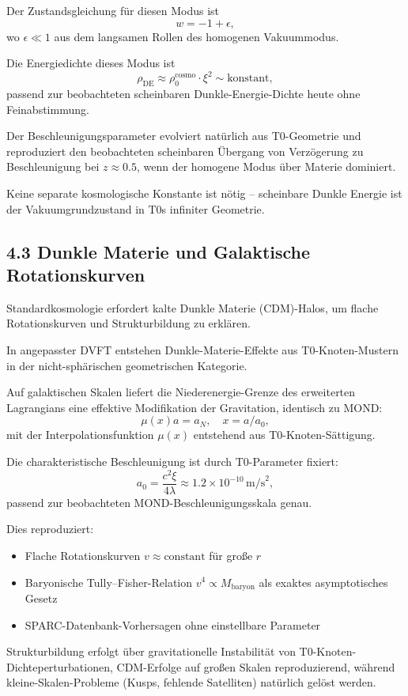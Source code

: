 	Der Zustandsgleichung für diesen Modus ist
	\[
	w = -1 + \epsilon,
	\]
	wo $\epsilon \ll 1$ aus dem langsamen Rollen des homogenen Vakuummodus.
	
	Die Energiedichte dieses Modus ist
	\[
	\rho_{\text{DE}} \approx \rho_0^{\text{cosmo}} \cdot \xi^2 \sim \text{konstant},
	\]
	passend zur beobachteten scheinbaren Dunkle-Energie-Dichte heute ohne Feinabstimmung.
	
	Der Beschleunigungsparameter evolviert natürlich aus T0-Geometrie und reproduziert den beobachteten scheinbaren Übergang von Verzögerung zu Beschleunigung bei $z \approx 0.5$, wenn der homogene Modus über Materie dominiert.
	
	Keine separate kosmologische Konstante ist nötig – scheinbare Dunkle Energie ist der Vakuumgrundzustand in T0s infiniter Geometrie.
	
	\subsection{4.3 Dunkle Materie und Galaktische Rotationskurven}
	
	Standardkosmologie erfordert kalte Dunkle Materie (CDM)-Halos, um flache Rotationskurven und Strukturbildung zu erklären.
	
	In angepasster DVFT entstehen Dunkle-Materie-Effekte aus T0-Knoten-Mustern in der nicht-sphärischen geometrischen Kategorie.
	
	Auf galaktischen Skalen liefert die Niederenergie-Grenze des erweiterten Lagrangians eine effektive Modifikation der Gravitation, identisch zu MOND:
	\[
	\mu(x) a = a_N, \quad x = a / a_0,
	\]
	mit der Interpolationsfunktion $\mu(x)$ entstehend aus T0-Knoten-Sättigung.
	
	Die charakteristische Beschleunigung ist durch T0-Parameter fixiert:
	\[
	a_0 = \frac{c^2 \xi}{4 \lambda} \approx 1.2 \times 10^{-10} \, \text{m/s}^2,
	\]
	passend zur beobachteten MOND-Beschleunigungsskala genau.
	
	Dies reproduziert:
	\begin{itemize}
		\item Flache Rotationskurven $v \approx \text{constant}$ für große $r$
		\item Baryonische Tully–Fisher-Relation $v^4 \propto M_{\text{baryon}}$ als exaktes asymptotisches Gesetz
		\item SPARC-Datenbank-Vorhersagen ohne einstellbare Parameter
	\end{itemize}
	
	Strukturbildung erfolgt über gravitationelle Instabilität von T0-Knoten-Dichteperturbationen, CDM-Erfolge auf großen Skalen reproduzierend, während kleine-Skalen-Probleme (Kusps, fehlende Satelliten) natürlich gelöst werden.
	
